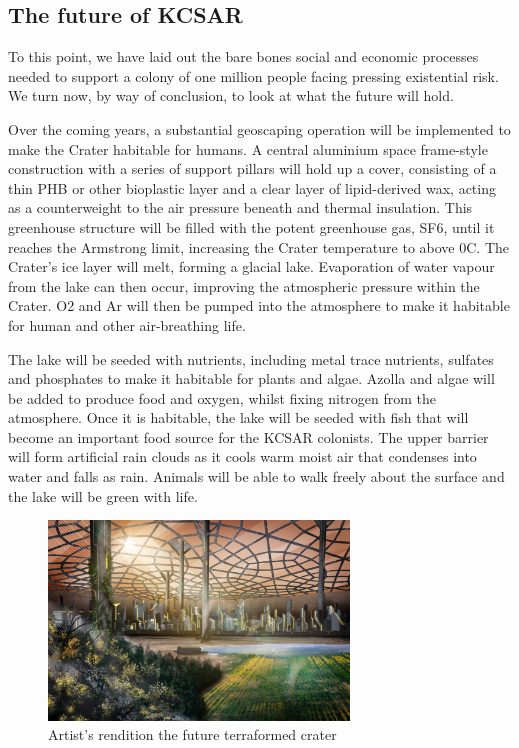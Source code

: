 \documentclass[fleqn,10pt]{Stylesheet} %
\begin{document}
\subsection{The future of KCSAR}
To this point, we have laid out the bare bones social and economic processes needed to support a colony of one million people facing pressing existential risk. We turn now, by way of conclusion, to look at what the future will hold. 

Over the coming years, a substantial geoscaping operation will be implemented to make the Crater habitable for humans. A central aluminium space frame-style construction with a series of support pillars will hold up a cover, consisting of a thin PHB or other bioplastic layer and a clear layer of lipid-derived wax, acting as a counterweight to the air pressure beneath and thermal insulation. This greenhouse structure will be filled with the potent greenhouse gas, SF6, until it reaches the Armstrong limit, increasing the Crater temperature to above 0\degree{}C. The Crater’s ice layer will melt, forming a glacial lake. Evaporation of water vapour from the lake can then occur, improving the atmospheric pressure within the Crater. O2 and Ar will then be pumped into the atmosphere to make it habitable for human and other air-breathing life.

The lake will be seeded with nutrients, including metal trace nutrients, sulfates and phosphates to make it habitable for plants and algae. Azolla and algae will be added to produce food and oxygen, whilst fixing nitrogen from the atmosphere. Once it is habitable, the lake will be seeded with fish that will become an important food source for the KCSAR colonists. The upper barrier will form artificial rain clouds as it cools warm moist air that condenses into water and falls as rain. Animals will be able to walk freely about the surface and the lake will be green with life. 

\begin{figure}
    \centering
    \includegraphics[width=80mm]{art/terraformed_dome.jpg}
    \caption{Artist's rendition the future terraformed crater}
    \label{fig:final_dome}
\end{figure}
\end{document}
